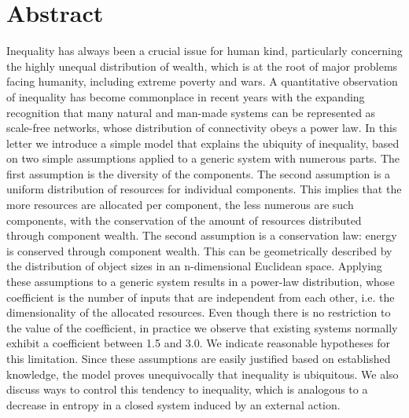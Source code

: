 \documentclass[10pt,letterpaper]{article}
\begin{document}
\section*{Abstract}
Inequality has always been a crucial issue for human kind,
particularly concerning the highly unequal distribution of wealth,
which is at the root of major problems facing humanity, including extreme poverty and wars.
A quantitative observation of inequality has become commonplace in recent years
with the expanding recognition that many natural and man-made systems can be represented as scale-free networks,
whose distribution of connectivity obeys a power law.
In this letter we introduce a simple model that explains the ubiquity of inequality,
based on two simple assumptions applied to a generic system with numerous parts.
The first assumption is the diversity of the components.
The second assumption is a uniform distribution of resources for individual components.
This implies that the more resources are allocated per component, the less numerous are such components,
with the conservation of the amount of resources distributed through component wealth.
The second assumption is a conservation law: energy is conserved through component wealth.
This can be geometrically described by the distribution of object sizes in an n-dimensional Euclidean space.
Applying these assumptions to a generic system results in a power-law distribution,
whose coefficient is the number of inputs that are independent from each other,
i.e. the dimensionality of the allocated resources.
Even though there is no restriction to the value of the coefficient,
in practice we observe that existing systems normally exhibit a coefficient between 1.5 and 3.0.
We indicate reasonable hypotheses for this limitation.
Since these assumptions are easily justified based on established knowledge,
the model proves unequivocally that inequality is ubiquitous.
We also discuss ways to control this tendency to inequality,
which is analogous to a decrease in entropy in a closed system induced by an external action.
\end{document}

